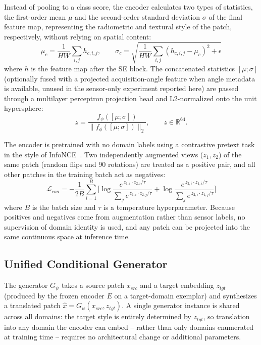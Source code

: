 \documentclass[conference]{IEEEtran}
\begin{document}
Instead of pooling to a class score, the encoder calculates two types of statistics, the first-order mean $\mu$ and the second-order standard deviation $\sigma$ of the final feature map, representing the radiometric and textural style of the patch, respectively, without relying on spatial content:
\begin{equation}
\mu_c = \frac{1}{HW}\sum_{i,j} h_{c,i,j}, \qquad
\sigma_c = \sqrt{\frac{1}{HW}\sum_{i,j}(h_{c,i,j}-\mu_c)^2 + \epsilon}
\label{eq:stats}
\end{equation}
where $h$ is the feature map after the SE block. The concatenated statistics $[\mu;\sigma]$ (optionally fused with a projected acquisition-angle feature when angle metadata is available, unused in the sensor-only experiment reported here) are passed through a multilayer perceptron projection head and L2-normalized onto the unit hypersphere:
\begin{equation}
z = \frac{f_\phi([\mu;\sigma])}{\lVert f_\phi([\mu;\sigma]) \rVert_2}, \qquad z \in \mathbb{R}^{64}.
\label{eq:embed}
\end{equation}

The encoder is pretrained with no domain labels using a contrastive pretext task in the style of InfoNCE~\cite{oord2018cpc}. Two independently augmented views ($z_1, z_2$) of the same patch (random flips and 90\textdegree{} rotations) are treated as a positive pair, and all other patches in the training batch act as negatives:
\begin{equation}
\mathcal{L}_{con} = -\frac{1}{2B}\sum_{i=1}^{B}\Big[
\log\frac{e^{\,z_{1,i}\cdot z_{2,i}/\tau}}{\sum_{j} e^{\,z_{1,i}\cdot z_{2,j}/\tau}}
+
\log\frac{e^{\,z_{2,i}\cdot z_{1,i}/\tau}}{\sum_{j} e^{\,z_{2,i}\cdot z_{1,j}/\tau}}
\Big]
\label{eq:infonce}
\end{equation}
where $B$ is the batch size and $\tau$ is a temperature hyperparameter. Because positives and negatives come from augmentation rather than sensor labels, no supervision of domain identity is used, and any patch can be projected into the same continuous space at inference time.

\subsection{Unified Conditional Generator}
\label{sec:generator}
The generator $G_\psi$ takes a source patch $x_{src}$ and a target embedding $z_{tgt}$ (produced by the frozen encoder $E$ on a target-domain exemplar) and synthesizes a translated patch $\hat{x} = G_\psi(x_{src}, z_{tgt})$. A single generator instance is shared across all domains: the target style is entirely determined by $z_{tgt}$, so translation into any domain the encoder can embed -- rather than only domains enumerated at training time -- requires no architectural change or additional parameters.
\end{document}
